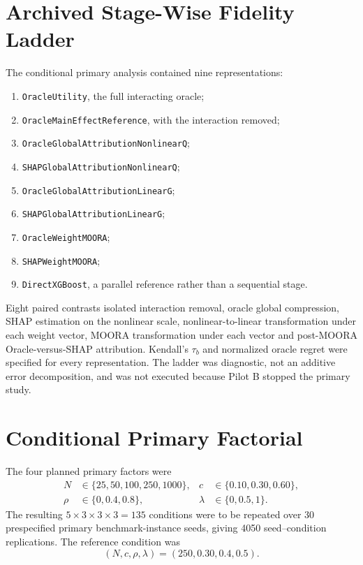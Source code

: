 \documentclass[runningheads]{llncs}
\begin{document}
\section{Archived Stage-Wise Fidelity Ladder}

The conditional primary analysis contained nine representations:
\begin{enumerate}
\item \texttt{OracleUtility}, the full interacting oracle;
\item \texttt{OracleMainEffectReference}, with the interaction removed;
\item \texttt{OracleGlobalAttributionNonlinearQ};
\item \texttt{SHAPGlobalAttributionNonlinearQ};
\item \texttt{OracleGlobalAttributionLinearG};
\item \texttt{SHAPGlobalAttributionLinearG};
\item \texttt{OracleWeightMOORA};
\item \texttt{SHAPWeightMOORA};
\item \texttt{DirectXGBoost}, a parallel reference rather than a sequential stage.
\end{enumerate}
Eight paired contrasts isolated interaction removal, oracle global compression, SHAP estimation
on the nonlinear scale, nonlinear-to-linear transformation under each weight vector, MOORA
transformation under each vector and post-MOORA Oracle-versus-SHAP attribution. Kendall's
$\tau_b$ and normalized oracle regret were specified for every representation. The ladder was
diagnostic, not an additive error decomposition, and was not executed because Pilot B stopped
the primary study.

\section{Conditional Primary Factorial}

The four planned primary factors were
\begin{align}
N&\in\{25,50,100,250,1000\}, &
c&\in\{0.10,0.30,0.60\},\label{supp:eq:factors1}\\
\rho&\in\{0,0.4,0.8\}, &
\lambda&\in\{0,0.5,1\}.
\label{supp:eq:factors2}
\end{align}
The resulting $5\times3\times3\times3=135$ conditions were to be repeated over 30
prespecified primary benchmark-instance seeds, giving 4050 seed--condition replications. The
reference condition was
\begin{equation}
(N,c,\rho,\lambda)=(250,0.30,0.4,0.5).
\label{supp:eq:reference}
\end{equation}
\end{document}
